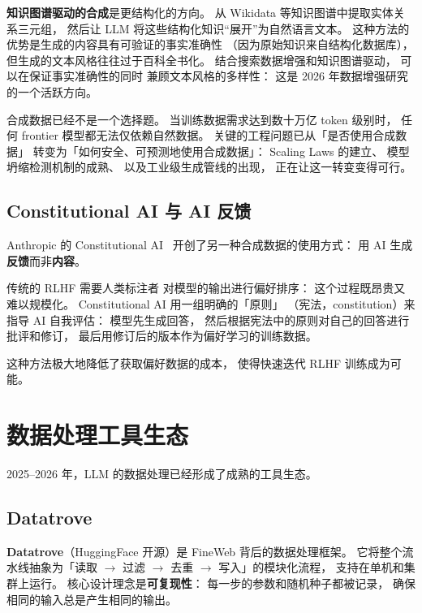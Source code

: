 \textbf{知识图谱驱动的合成}是更结构化的方向。
从 Wikidata 等知识图谱中提取实体关系三元组，
然后让 LLM 将这些结构化知识“展开”为自然语言文本。
这种方法的优势是生成的内容具有可验证的事实准确性
（因为原始知识来自结构化数据库），
但生成的文本风格往往过于百科全书化。
结合搜索数据增强和知识图谱驱动，
可以在保证事实准确性的同时
兼顾文本风格的多样性：
这是 2026 年数据增强研究的一个活跃方向。

\begin{warnbox}[2026 年的合成数据现实]
合成数据已经不是一个选择题。
当训练数据需求达到数十万亿 token 级别时，
任何 frontier 模型都无法仅依赖自然数据。
关键的工程问题已从「是否使用合成数据」
转变为「如何安全、可预测地使用合成数据」：
Scaling Laws 的建立、
模型坍缩检测机制的成熟、
以及工业级生成管线的出现，
正在让这一转变变得可行。
\end{warnbox}

\subsection{Constitutional AI 与 AI 反馈}

Anthropic 的 Constitutional AI~\cite{bai2022constitutional}
开创了另一种合成数据的使用方式：
用 AI 生成\textbf{反馈}而非\textbf{内容}。

传统的 RLHF 需要人类标注者
对模型的输出进行偏好排序：
这个过程既昂贵又难以规模化。
Constitutional AI 用一组明确的「原则」
（宪法，constitution）来指导 AI 自我评估：
模型先生成回答，
然后根据宪法中的原则对自己的回答进行批评和修订，
最后用修订后的版本作为偏好学习的训练数据。

这种方法极大地降低了获取偏好数据的成本，
使得快速迭代 RLHF 训练成为可能。

\section{数据处理工具生态}

2025--2026 年，LLM 的数据处理已经形成了成熟的工具生态。

\subsection{Datatrove}

\textbf{Datatrove}（HuggingFace 开源）是 FineWeb 背后的数据处理框架。
它将整个流水线抽象为「读取 $\to$ 过滤 $\to$ 去重 $\to$ 写入」的模块化流程，
支持在单机和集群上运行。
核心设计理念是\textbf{可复现性}：
每一步的参数和随机种子都被记录，
确保相同的输入总是产生相同的输出。

